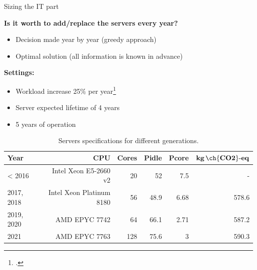 \documentclass[Ligatures=TeX,table,svgnames,usetotalslideindicator,compress,10pt,aspectratio=169]{beamer}
\begin{document}
\begin{frame}{Sizing the IT part}

\textbf{Is it worth to add/replace the servers every year?}
\begin{itemize}
 \item Decision made year by year (greedy approach)
 \item Optimal solution (all information is known in advance)
\end{itemize}
\textbf{Settings:}
\begin{itemize}
    \item Workload increase 25\% per year\footcite{cisco_global_cloud_index_2018}
    \item Server expected lifetime of 4 years
    \item 5 years of operation
\end{itemize}

\begin{table}[h]
  \small
  \label{tab:servers_specs} 
  \caption{Servers specifications for different generations.} \centering
  \begin{tabular}{|l|r|r|r|r|r|}
  \hline    
  \textbf{Year} & \textbf{CPU} &   \textbf{Cores} & \textbf{Pidle}  & \textbf{Pcore}  & \textbf{$\mathbf{kg\,\ch{CO2}\text{-}eq}$}  \\
  \hline
  < 2016      & Intel Xeon E5-2660 v2 & 20 & 52 & 7.5  & -   \\
  \hline
  2017, 2018 & Intel Xeon Platinum 8180 & 56 & 48.9 & 6.68  & 578.6   \\
  \hline
  2019, 2020   & AMD EPYC 7742  & 64 & 66.1 & 2.71  & 587.2 \\
  \hline
  2021        & AMD EPYC 7763 & 128 & 75.6 & 3     & 590.3 \\
  \hline
  
\end{tabular}  
\end{table}
\end{frame}
\end{document}

